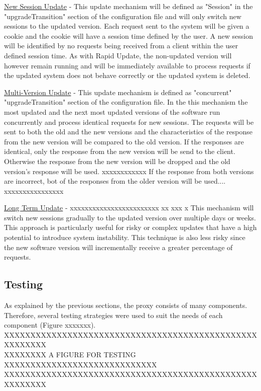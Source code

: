 \documentclass[a4paper,11pt,twoside]{article}
\begin{document}
\underline{New Session Update} - This update mechanism will be defined as "Session" in the "upgradeTransition" section of the configuration file and will only switch new sessions to the updated version. Each request sent to the system will be given a cookie and the cookie will have a session time defined by the user. A new session will be identified by no requests being received from a client within the user defined session time.  As with Rapid Update, the non-updated version will however remain running and will be immediately available to process requests if the updated system does not behave correctly or the updated system is deleted.

\underline{Multi-Version Update} - This update mechanism is defined as "concurrent"  "upgradeTransition" section of the configuration file. In the  this mechanism the most updated and the next most updated versions of the software run concurrently and  process identical requests for new sessions. The requests will be sent to both the old and the new versions and the characteristics of the response from the new version will be compared to the old version. If the responses are identical, only the response from the new version will be send to the client. Otherwise the response from the new version will be dropped and the old version's response will be used. xxxxxxxxxxxx If the response from both versions are incorrect, bot of the responses from the older version will be used.... xxxxxxxxxxxxxxxx  


\underline{Long Term Update} - xxxxxxxxxxxxxxxxxxxxxxxx xx    xxx  x This mechanism will switch new sessions gradually to the updated version over multiple days or weeks. This approach is particularly useful for risky or complex updates that have a high potential to introduce system instability. This technique is also less risky since the new software version will incrementally receive a greater percentage of requests.



\subsection{Testing}
As explained by the previous sections, the proxy consists of many components. Therefore, several testing strategies were used to suit the needs of each component (Figure xxxxxxx).\\

XXXXXXXXXXXXXXXXXXXXXXXXXXXXXXXXXXXXXXXXXXXXXXXXXXXXXXXX\\
XXXXXXXX A FIGURE FOR TESTING XXXXXXXXXXXXXXXXXXXXXXXXXXXXX\\
XXXXXXXXXXXXXXXXXXXXXXXXXXXXXXXXXXXXXXXXXXXXXXXXXXXXXXXX\\ 
\end{document}

